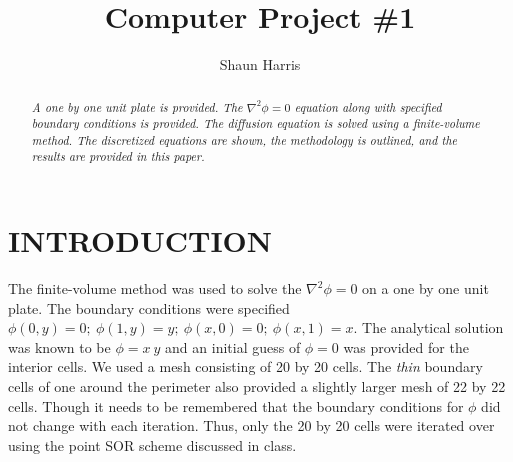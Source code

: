 \documentclass[cleanfoot,cleanhead,twocolumn,10pt,notitlepage]{asme2e}
\title{Computer Project \#1}
\author{Shaun Harris
    \affiliation{
	Department of Mechanical and Aerospace Engineering\\
	Utah State University \\
    Email: shaun.r.harris@gmail.com
    }
}
\begin{document}
\maketitle    


\begin{abstract}
{\it A one by one unit plate is provided.  The $\nabla^2 \phi = 0$ equation along with specified boundary conditions is provided.  The diffusion equation is solved using a finite-volume method.  The discretized equations are shown, the methodology is outlined, and the results are provided in this paper.}
\end{abstract}


\begin{nomenclature}
\end{nomenclature}


\section*{INTRODUCTION}

The finite-volume method was used to solve the $\nabla^2 \phi = 0$ on a one by one unit plate.  The boundary conditions were specified  $\phi(0,y) = 0;~ \phi(1,y) = y;~ \phi(x,0) = 0;~ \phi(x,1) = x$.  The analytical solution was known to be $\phi = x~y$ and an initial guess of $\phi = 0$ was provided for the interior cells.  We used a mesh consisting of 20 by 20 cells.  The \textit{thin} boundary cells of one around the perimeter also provided a slightly larger mesh of 22 by 22 cells.  Though it needs to be remembered that the boundary conditions for $\phi$ did not change with each iteration.  Thus, only the 20 by 20 cells were iterated over using the point SOR scheme discussed in class.  
\end{document}
